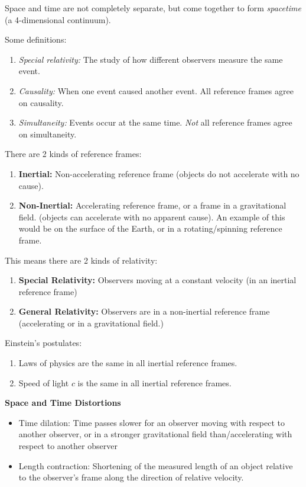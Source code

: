 \documentclass[12pt]{article}
\begin{document}
Space and time are not completely separate, but come together to form \textit{spacetime} (a 4-dimensional continuum).

Some definitions:
\begin{enumerate}
	\item \textit{Special relativity:} The study of how different observers measure the same event.
	\item \textit{Causality:} When one event caused another event. All reference frames agree on causality.
	\item \textit{Simultaneity:} Events occur at the same time. \textit{Not} all reference frames agree on simultaneity.
\end{enumerate}

There are 2 kinds of reference frames:
\begin{enumerate}
	\item \textbf{Inertial:} Non-accelerating reference frame (objects do not accelerate with no cause).
	\item \textbf{Non-Inertial:} Accelerating reference frame, or a frame in a gravitational field. (objects can accelerate with no apparent cause). An example of this would be on the surface of the Earth, or in a rotating/spinning reference frame.
\end{enumerate}

This means there are 2 kinds of relativity:
	\begin{enumerate}
		\item \textbf{Special Relativity:} Observers moving at a constant velocity (in an inertial reference frame)
		\item \textbf{General Relativity:} Observers are in a non-inertial reference frame (accelerating or in a gravitational field.)
	\end{enumerate}

Einstein's postulates:
\begin{enumerate}
	\item Laws of physics are the same in all inertial reference frames.
	\item Speed of light $c$ is the same in all inertial reference frames.
\end{enumerate}

\textbf{Space and Time Distortions}
\begin{itemize}
	\item Time dilation: Time passes slower for an observer moving with respect to another observer, or in a stronger gravitational field than/accelerating with respect to another observer
	\item Length contraction: Shortening of the measured length of an object relative to the observer's frame along the direction of relative velocity.
\end{itemize}
\end{document}
